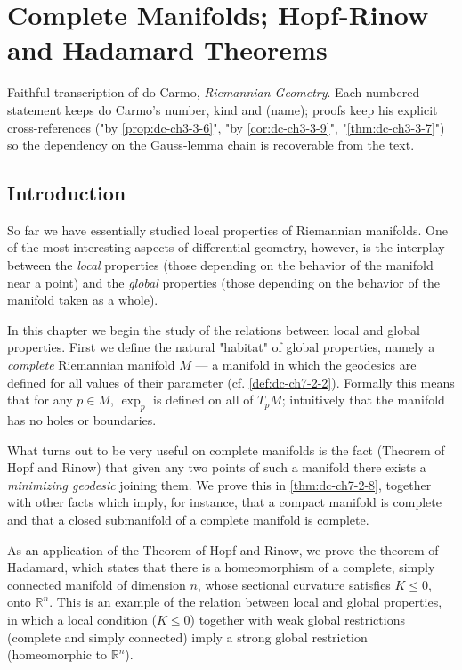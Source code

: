 \chapter{Complete Manifolds; Hopf-Rinow and Hadamard Theorems}
\label{chap:dc-complete-manifolds-hopf-rinow-hadamard}

Faithful transcription of do Carmo, \emph{Riemannian Geometry}. Each numbered
statement keeps do Carmo's number, kind and (name); proofs keep his explicit
cross-references ("by \cref{prop:dc-ch3-3-6}", "by \cref{cor:dc-ch3-3-9}", "\cref{thm:dc-ch3-3-7}") so the dependency on the Gauss-lemma
chain is recoverable from the text.

\section{Introduction}

So far we have essentially studied local properties of Riemannian manifolds. One
of the most interesting aspects of differential geometry, however, is the
interplay between the \emph{local} properties (those depending on the behavior of the
manifold near a point) and the \emph{global} properties (those depending on the
behavior of the manifold taken as a whole).

In this chapter we begin the study of the relations between local and global
properties. First we define the natural "habitat" of global properties, namely a
\emph{complete} Riemannian manifold $M$ — a manifold in which the geodesics are
defined for all values of their parameter (cf. \cref{def:dc-ch7-2-2}). Formally this
means that for any $p\in M$, $\exp_p$ is defined on all of $T_pM$; intuitively
that the manifold has no holes or boundaries.

What turns out to be very useful on complete manifolds is the fact (Theorem of
Hopf and Rinow) that given any two points of such a manifold there exists a
\emph{minimizing geodesic} joining them. We prove this in \cref{thm:dc-ch7-2-8}, together with
other facts which imply, for instance, that a compact manifold is complete and
that a closed submanifold of a complete manifold is complete.

As an application of the Theorem of Hopf and Rinow, we prove the theorem of
Hadamard, which states that there is a homeomorphism of a complete, simply
connected manifold of dimension $n$, whose sectional curvature satisfies
$K\le 0$, onto $\mathbb{R}^n$. This is an example of the relation between local
and global properties, in which a local condition ($K\le 0$) together with weak
global restrictions (complete and simply connected) imply a strong global
restriction (homeomorphic to $\mathbb{R}^n$).

